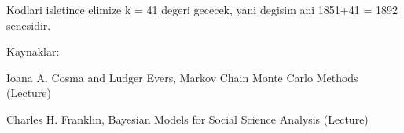 \documentclass[12pt,fleqn]{article}\usepackage{../common}
\begin{document}
Kodlari isletince elimize k = 41 degeri gececek, yani degisim ani
1851+41 = 1892 senesidir.



Kaynaklar: 

Ioana A. Cosma and Ludger Evers, Markov Chain Monte Carlo Methods (Lecture) 

Charles H. Franklin, Bayesian Models for Social Science Analysis (Lecture)
\end{document}
